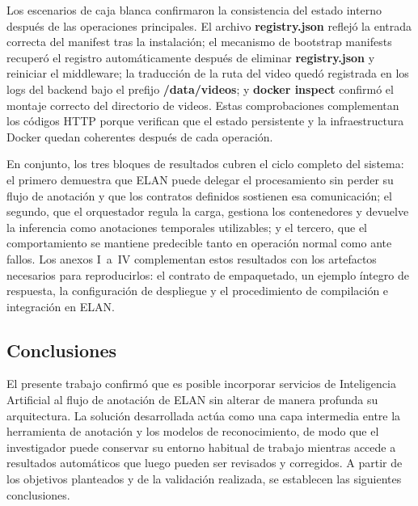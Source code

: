 Los escenarios de caja blanca confirmaron la consistencia del estado interno después de las operaciones principales. El archivo \textbf{registry.json} reflejó la entrada correcta del manifest tras la instalación; el mecanismo de bootstrap manifests recuperó el registro automáticamente después de eliminar \textbf{registry.json} y reiniciar el middleware; la traducción de la ruta del video quedó registrada en los logs del backend bajo el prefijo \textbf{/data/videos}; y \textbf{docker inspect} confirmó el montaje correcto del directorio de videos. Estas comprobaciones complementan los códigos HTTP porque verifican que el estado persistente y la infraestructura Docker quedan coherentes después de cada operación.

En conjunto, los tres bloques de resultados cubren el ciclo completo del sistema: el primero demuestra que ELAN puede delegar el procesamiento sin perder su flujo de anotación y que los contratos definidos sostienen esa comunicación; el segundo, que el orquestador regula la carga, gestiona los contenedores y devuelve la inferencia como anotaciones temporales utilizables; y el tercero, que el comportamiento se mantiene predecible tanto en operación normal como ante fallos. Los anexos I~a~IV complementan estos resultados con los artefactos necesarios para reproducirlos: el contrato de empaquetado, un ejemplo íntegro de respuesta, la configuración de despliegue y el procedimiento de compilación e integración en ELAN.

\vspace{1\baselineskip}


\subsection{Conclusiones}

El presente trabajo confirmó que es posible incorporar servicios de Inteligencia Artificial al flujo de anotación de ELAN sin alterar de manera profunda su arquitectura. La solución desarrollada actúa como una capa intermedia entre la herramienta de anotación y los modelos de reconocimiento, de modo que el investigador puede conservar su entorno habitual de trabajo mientras accede a resultados automáticos que luego pueden ser revisados y corregidos. A partir de los objetivos planteados y de la validación realizada, se establecen las siguientes conclusiones.

